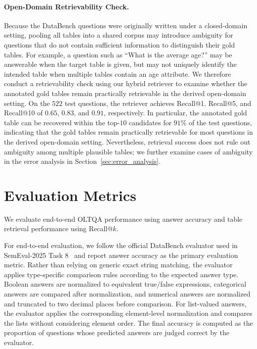 \paragraph{Open-Domain Retrievability Check.}
Because the DataBench questions were originally written under a closed-domain setting, pooling all tables into a shared corpus may introduce ambiguity for questions that do not contain sufficient information to distinguish their gold tables.
For example, a question such as ``What is the average age?'' may be answerable when the target table is given, but may not uniquely identify the intended table when multiple tables contain an age attribute.
We therefore conduct a retrievability check using our hybrid retriever to examine whether the annotated gold tables remain practically retrievable in the derived open-domain setting.
On the $522$ test questions, the retriever achieves Recall@1, Recall@5, and Recall@10 of $0.65$, $0.83$, and $0.91$, respectively.
In particular, the annotated gold table can be recovered within the top-$10$ candidates for $91\%$ of the test questions, indicating that the gold tables remain practically retrievable for most questions in the derived open-domain setting.
Nevertheless, retrieval success does not rule out ambiguity among multiple plausible tables; we further examine cases of ambiguity in the error analysis in Section~\ref{sec:error_analysis}.

\section{Evaluation Metrics}

We evaluate end-to-end OLTQA performance using answer accuracy and table retrieval performance using Recall@$k$.

For end-to-end evaluation, we follow the official DataBench evaluator used in SemEval-2025 Task 8~\cite{semeval2025task8} and report answer accuracy as the primary evaluation metric.
Rather than relying on generic exact string matching, the evaluator applies type-specific comparison rules according to the expected answer type.
Boolean answers are normalized to equivalent true/false expressions, categorical answers are compared after normalization, and numerical answers are normalized and truncated to two decimal places before comparison.
For list-valued answers, the evaluator applies the corresponding element-level normalization and compares the lists without considering element order.
The final accuracy is computed as the proportion of questions whose predicted answers are judged correct by the evaluator.

